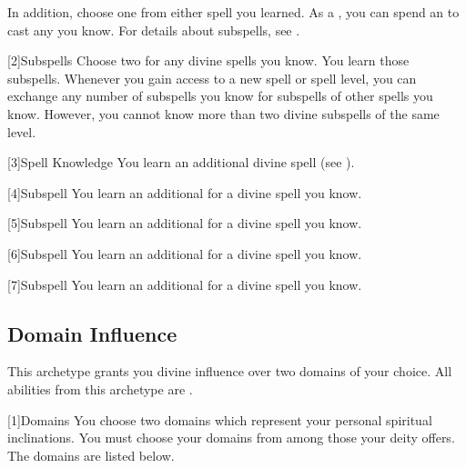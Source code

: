         In addition, choose one  from either spell you learned.
        As a , you can spend an  to cast any  you know.
        For details about subspells, see .

        [2]{Subspells} Choose two  for any divine spells you know.
        You learn those subspells.
        Whenever you gain access to a new spell or spell level, you can exchange any number of subspells you know for subspells of other spells you know.
        However, you cannot know more than two divine subspells of the same level.

        [3]{Spell Knowledge}
        You learn an additional divine spell (see ).

        [4]{Subspell}
        You learn an additional  for a divine spell you know.

        [5]{Subspell}
        You learn an additional  for a divine spell you know.

        [6]{Subspell}
        You learn an additional  for a divine spell you know.

        [7]{Subspell}
        You learn an additional  for a divine spell you know.

    \subsection{Domain Influence}
        This archetype grants you divine influence over two domains of your choice.
        All abilities from this archetype are .

        [1]{Domains}
        You choose two domains which represent your personal spiritual inclinations.
        You must choose your domains from among those your deity offers.
        The domains are listed below.

